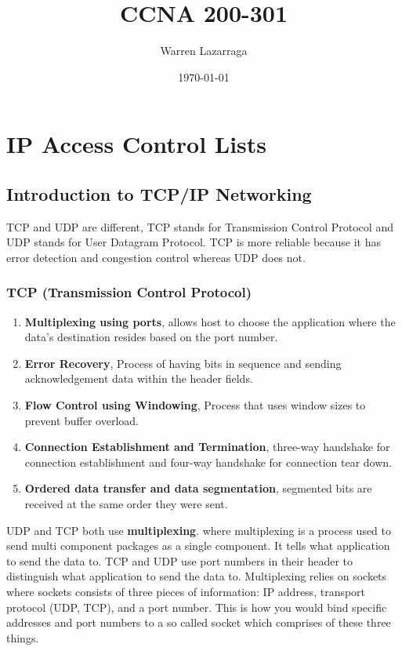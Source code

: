 \documentclass[a4paper]{article}
\title{CCNA 200-301}
\author{Warren Lazarraga}
\date{\today}
\begin{document}
\maketitle

\section{IP Access Control Lists}

    \subsection{Introduction to TCP/IP Networking}
    TCP and UDP are different, TCP stands for Transmission Control Protocol and UDP stands for User Datagram Protocol. TCP is more reliable because it has error detection and congestion control whereas UDP does not. 
    \subsubsection{TCP (Transmission Control Protocol) }
    \begin{enumerate}
        \item \textbf{Multiplexing using ports}, allows host to choose the application where the data's destination resides based on the port number. 
        \item \textbf{Error Recovery}, Process of having bits in sequence and sending acknowledgement data within the header fields. 
        \item  \textbf{Flow Control using Windowing}, Process that uses window sizes to prevent buffer overload. 
        \item  \textbf{Connection Establishment and Termination}, three-way handshake for connection establishment and four-way handshake for connection tear down. 
        \item \textbf{Ordered data transfer and data segmentation}, segmented bits are received at the same order they were sent. 
    \end{enumerate}

    UDP and TCP both use \textbf{multiplexing}. where multiplexing is a process used to send multi component packages as a single component. It tells what application to send the data to. TCP and UDP use port numbers in their header to distinguish what application to send the data to. Multiplexing relies on sockets where sockets consists of three pieces of information: IP address, transport protocol (UDP, TCP), and a port number. This is how you would bind specific addresses and port numbers to a so called socket which comprises of these three things. 
\end{document}
